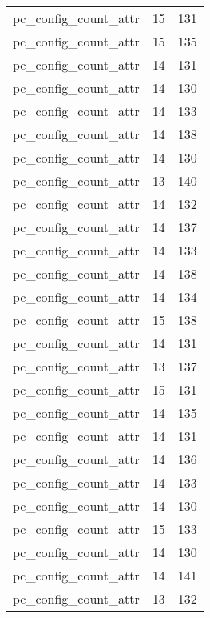 \begin{table}
\begin{tabular}{lrr}
            pc\_config\_count\_attr &        15 &       131 \\
            pc\_config\_count\_attr &        15 &       135 \\
            pc\_config\_count\_attr &        14 &       131 \\
            pc\_config\_count\_attr &        14 &       130 \\
            pc\_config\_count\_attr &        14 &       133 \\
            pc\_config\_count\_attr &        14 &       138 \\
            pc\_config\_count\_attr &        14 &       130 \\
            pc\_config\_count\_attr &        13 &       140 \\
            pc\_config\_count\_attr &        14 &       132 \\
            pc\_config\_count\_attr &        14 &       137 \\
            pc\_config\_count\_attr &        14 &       133 \\
            pc\_config\_count\_attr &        14 &       138 \\
            pc\_config\_count\_attr &        14 &       134 \\
            pc\_config\_count\_attr &        15 &       138 \\
            pc\_config\_count\_attr &        14 &       131 \\
            pc\_config\_count\_attr &        13 &       137 \\
            pc\_config\_count\_attr &        15 &       131 \\
            pc\_config\_count\_attr &        14 &       135 \\
            pc\_config\_count\_attr &        14 &       131 \\
            pc\_config\_count\_attr &        14 &       136 \\
            pc\_config\_count\_attr &        14 &       133 \\
            pc\_config\_count\_attr &        14 &       130 \\
            pc\_config\_count\_attr &        15 &       133 \\
            pc\_config\_count\_attr &        14 &       130 \\
            pc\_config\_count\_attr &        14 &       141 \\
            pc\_config\_count\_attr &        13 &       132 \\

\end{tabular}
\end{table}
